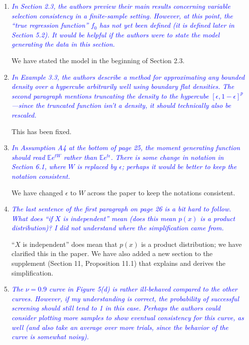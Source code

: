 \documentclass[pdftex,12pt]{article}
\def\E{{\mathbb E}}
\def\rc#1{{\it\textcolor{blue}{#1}}\smallskip}
\begin{document}
\begin{enumerate}
\item \rc{In Section 2.3, the authors preview their main results concerning variable selection consistency in a finite-sample setting. However, at this point, the “true regression function” $f_0$ has not yet been defined (it is defined later in Section 5.2). It would be helpful if the authors were to state the model generating the data in this section.}

We have stated the model in the beginning of Section 2.3.

\item \rc{In Example 3.3, the authors describe a method for approximating any bounded density over a hypercube arbitrarily well using boundary flat densities. The second paragraph mentions truncating the density to the hypercube $[\epsilon, 1−\epsilon]^p$—since the truncated function isn’t a density, it should technically also be rescaled.}

This has been fixed. 

\item \rc{In Assumption A4 at the bottom of page 25, the moment generating function should read $\E e^{tW}$ rather than $\E e^{t \epsilon}$. There is some change in notation in Section 6.1, where $W$ is replaced by $\epsilon$; perhaps it would be better to keep the notation consistent.}

We have changed $\epsilon$ to $W$ across the paper to keep the notations consistent. 

\item \rc{The last sentence of the first paragraph on page 26 is a bit hard to follow. What does “if $X$ is independent” mean (does this mean $p(x)$ is a product distribution)? I did not understand where the simplification came from.}

``$X$ is independent'' does mean that $p(x)$ is a product distribution; we have clarified this in the paper. We have also added a new section to the supplement (Section 11, Proposition 11.1) that explains and derives the simplification. 

\item \rc{The $\nu = 0.9$ curve in Figure 5(d) is rather ill-behaved compared to the other curves. However, if my understanding is correct, the probability of successful screening should still tend to 1 in this case. Perhaps the authors could consider plotting more samples to show eventual consistency for this curve, as well (and also take an average over more trials, since the behavior of the curve is somewhat noisy).}


\end{enumerate}
\end{document}
